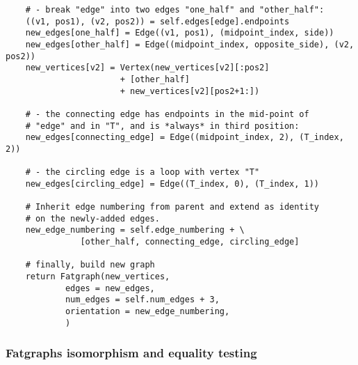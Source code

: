 \begin{lstlisting}
    # - break "edge" into two edges "one_half" and "other_half":
    ((v1, pos1), (v2, pos2)) = self.edges[edge].endpoints
    new_edges[one_half] = Edge((v1, pos1), (midpoint_index, side))
    new_edges[other_half] = Edge((midpoint_index, opposite_side), (v2, pos2))
    new_vertices[v2] = Vertex(new_vertices[v2][:pos2]
                       + [other_half]
                       + new_vertices[v2][pos2+1:])

    # - the connecting edge has endpoints in the mid-point of
    # "edge" and in "T", and is *always* in third position:
    new_edges[connecting_edge] = Edge((midpoint_index, 2), (T_index, 2))

    # - the circling edge is a loop with vertex "T"
    new_edges[circling_edge] = Edge((T_index, 0), (T_index, 1))

    # Inherit edge numbering from parent and extend as identity
    # on the newly-added edges.
    new_edge_numbering = self.edge_numbering + \
               [other_half, connecting_edge, circling_edge]

    # finally, build new graph 
    return Fatgraph(new_vertices,
            edges = new_edges,
            num_edges = self.num_edges + 3,
            orientation = new_edge_numbering,
            )
\end{lstlisting}


\subsubsection{Fatgraphs isomorphism and equality testing}
\label{sec:isomorphism}


